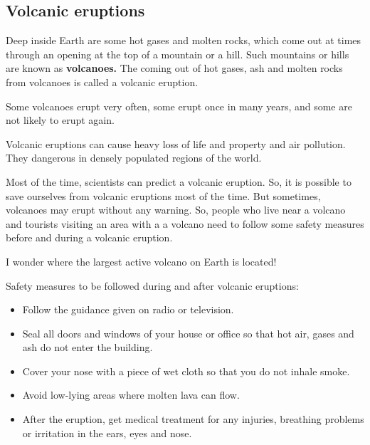 \subsection{\textbf{Volcanic eruptions}}
Deep inside Earth are some hot gases and molten rocks, which come out at times through an opening at the top of a mountain or a hill. Such mountains or hills are known as \textbf{volcanoes.}
The coming out of hot gases, ash and molten rocks from volcanoes is called a volcanic eruption.
\vspace{0.1in}
\par
Some volcanoes erupt very often, some erupt once in many years, and some are not likely to erupt again.
\vspace{0.1in}
\par
Volcanic eruptions can cause heavy loss of life and property and air pollution. They dangerous in densely populated regions of the world.
\vspace{0.5in}
\par
Most of the time, scientists can predict a volcanic eruption. So, it is possible to save ourselves from volcanic eruptions most of the time. But sometimes, volcanoes may erupt without any warning. So, people who live near a volcano and tourists visiting an area with a a volcano need to follow some safety measures before and during a volcanic eruption.
\vspace{0.1in}
\par
I wonder where the largest active volcano on Earth is located!
\vspace{0.1in}
\par
Safety measures to be followed during and after volcanic eruptions:
\begin{itemize}
    \item Follow the guidance given on radio or television.
    \item Seal all doors and windows of your house or office so that hot air, gases and ash do not enter the building.
    \item Cover your nose with a piece of wet cloth so that you do not inhale smoke.
    \item Avoid low-lying areas where molten lava can flow.
    \item After the eruption, get medical treatment for any injuries, breathing problems or irritation in the ears, eyes and nose.
\end{itemize}
